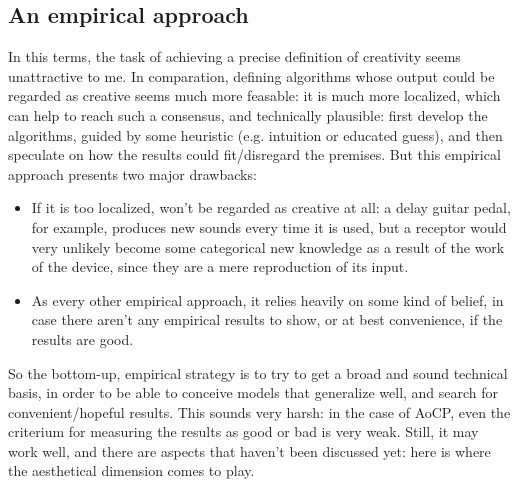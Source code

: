 \documentclass[11pt]{scrartcl} %
\begin{document}
\subsection*{An empirical approach}
In this terms, the task of achieving a precise definition of creativity seems unattractive to me. In comparation, defining algorithms whose output could be regarded as creative seems much more feasable: it is much more localized, which can help to reach such a consensus, and technically plausible: first develop the algorithms, guided by some heuristic (e.g. intuition or educated guess), and then speculate on how the results could fit/disregard the premises. But this empirical approach presents two major drawbacks:
\begin{itemize}
\item If it is too localized, won't be regarded as creative at all: a delay guitar pedal, for example, produces new sounds every time it is used, but a receptor would very unlikely become some categorical new knowledge as a result of the work of the device, since they are a mere reproduction of its input.
\item As every other empirical approach, it relies heavily on some kind of belief, in case there aren't any empirical results to show, or at best convenience, if the results are good.
\end{itemize}
So the bottom-up, empirical strategy is to try to get a broad and sound technical basis, in order to be able to conceive models that generalize well, and search for convenient/hopeful results. This sounds very harsh: in the case of AoCP, even the criterium for measuring the results as good or bad is very weak. Still, it may work well, and there are aspects that haven't been discussed yet: here is where the aesthetical dimension comes to play.
\end{document}
